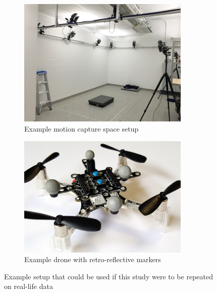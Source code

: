 \documentclass[letterpaper, preprint, paper,11pt]{AAS}	%
\begin{document}
\begin{figure}[htb]
\centering
\begin{subfigure}{.5\textwidth}
	\centering
	\includegraphics[width=0.9\textwidth]{Figures/ViconMotionCaptureSpace}
	\caption{Example motion capture space setup\cite{ViconMotionCaptureSpace}}
	\label{fig:ViconMotionCaptureSpace}
\end{subfigure}%
\begin{subfigure}{.5\textwidth}
	\centering
	\includegraphics[width=0.9\textwidth]{Figures/MotionCaptureDrone}
	\caption{Example drone with retro-reflective markers\cite{MotionCaptureDrone}}
	\label{fig:MotionCaptureDrone}
\end{subfigure}
\caption{Example setup that could be used if this study were to be repeated on real-life data}
\label{fig:MotionCaptureExample}
\end{figure}
\end{document}

